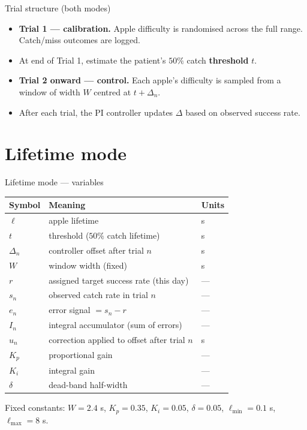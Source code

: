 \documentclass[10pt,aspectratio=169]{beamer}
\newcommand{\target}{r}
\newcommand{\obs}{s_n}
\newcommand{\err}{e_n}
\newcommand{\Kp}{K_p}
\newcommand{\Ki}{K_i}
\newcommand{\Iaccum}{I_n}
\newcommand{\dband}{\delta}
\begin{document}
\begin{frame}{Trial structure (both modes)}
\begin{itemize}
    \item \textbf{Trial 1 --- calibration.} Apple difficulty is randomised across the full range. Catch/miss outcomes are logged.
    \item At end of Trial 1, estimate the patient's $50\%$ catch \textbf{threshold} $t$.
    \item \textbf{Trial 2 onward --- control.} Each apple's difficulty is sampled from a window of width $W$ centred at $t + \Delta_n$.
    \item After each trial, the PI controller updates $\Delta$ based on observed success rate.
\end{itemize}
\end{frame}

\section{Lifetime mode}

\begin{frame}{Lifetime mode --- variables}
\begin{center}
\begin{tabular}{lll}
\toprule
Symbol & Meaning & Units \\
\midrule
$\ell$ & apple lifetime & s \\
$t$ & threshold ($50\%$ catch lifetime) & s \\
$\Delta_n$ & controller offset after trial $n$ & s \\
$W$ & window width (fixed) & s \\
$\target$ & assigned target success rate (this day) & --- \\
$\obs$ & observed catch rate in trial $n$ & --- \\
$\err$ & error signal $= \obs - \target$ & --- \\
$\Iaccum$ & integral accumulator (sum of errors) & --- \\
$u_n$ & correction applied to offset after trial $n$ & s \\
$\Kp$ & proportional gain & --- \\
$\Ki$ & integral gain & --- \\
$\dband$ & dead-band half-width & --- \\
\bottomrule
\end{tabular}
\end{center}
\vspace{0.5em}
Fixed constants: $W = 2.4$ s, $\Kp = 0.35$, $\Ki = 0.05$, $\dband = 0.05$, $\ell_{\min} = 0.1$ s, $\ell_{\max} = 8$ s.
\end{frame}
\end{document}
